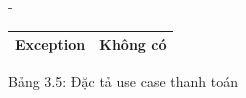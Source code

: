 \begin {list} {-}{}
\begin{itemize}
\begin{table}[h]
\begin{tabular}{|l|l|}
                \textbf{Exception}        & Không có                                                                                                                                                                                                                                                                                                                                                                                                                                                                                                                                                                                                                                                                                                                                                                                                                                   \\ \hline
                \end{tabular}
                \begin{center}
                    Bảng 3.5: Đặc tả use case thanh toán
                \end{center}
                \end{table}
                

\end{itemize}
\end{list}
